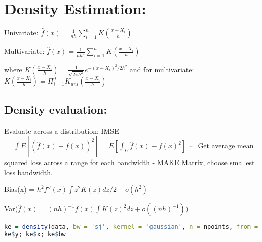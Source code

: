 \section*{Density Estimation:}

Univariate: $\hat{f}(x)=\frac{1}{nh}\sum^{n}_{i=1}K(\frac{x-X_i}{h})$

\noindent Multivariate: $\hat{f}(x) = \frac{1}{nh^d}\sum^{n}_{i=1}K(\frac{x-X_i}{h})$

\noindent where $K(\frac{x-X_i}{h}) = \frac{1}{\sqrt{2\pi h^2}}e^{-(x-X_i)^2/2h^2}$ and for multivariate: $K(\frac{x-X_i}{h}) = \Pi^d_{i=1}K_{uni}(\frac{x-X_i}{h}) $

\subsection*{Density evaluation:}

Evaluate across a distribution: IMSE $= \int E[(\hat{f}(x)-f(x))^2] = E[\int_\Omega \hat{f}(x)-f(x)^2] \sim$  Get average mean squared loss across a range for each bandwidth - MAKE Matrix, choose smallest loss bandwidth.

\noindent Bias(x) = $h^2f''(x)\int z^2 K(z) dz/2 + o(h^2)$

\noindent Var($\hat{f}(x) = (nh)^{-1} f(x) \int K(z)^2 dz + o((nh)^{-1}))$

\begin{lstlisting}[language = R]
ke = density(data, bw = 'sj', kernel = 'gaussian', n = npoints, from = -1, to = 5)
ke$y; ke$x; ke$bw
\end{lstlisting}